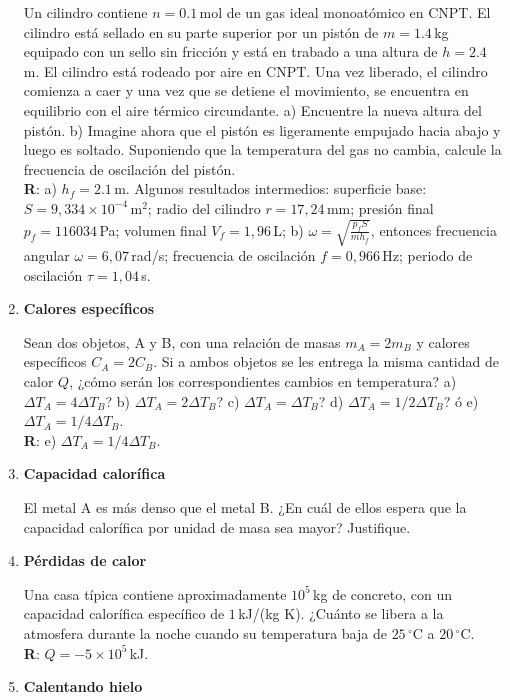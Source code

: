 \documentclass[a4paper,12pt]{article}
\begin{document}
\begin{enumerate}
		Un cilindro contiene $n=0.1$\,mol de un gas ideal monoatómico en CNPT.
		El cilindro está sellado en su parte superior por un pistón de
		$m=1.4$\,kg equipado con un sello sin fricción y está en trabado a una
		altura de $h=2.4$\,m. El cilindro está rodeado por aire en CNPT. Una
		vez liberado, el cilindro comienza a caer y una vez que se detiene el
		movimiento, se encuentra en equilibrio con el aire térmico circundante.
		a) Encuentre la nueva altura del pistón. b) Imagine ahora que el pistón
		es ligeramente empujado hacia abajo y luego es soltado. Suponiendo que
		la temperatura del gas no cambia, calcule la frecuencia de oscilación
		del pistón.
		\\{\bf R}: a) $h_f=2.1$\,m. Algunos resultados intermedios: superficie
		base: $S=9,334 \times 10^{-4}$\,m$^2$; radio del cilindro
		$r=17,24$\,mm; presión final $p_f=116034$\,Pa; volumen final
		$V_f=1,96$\,L; b) $\omega=\sqrt{\frac{p_f S}{m h_f}}$, entonces
		frecuencia angular $\omega=6,07$\,rad/s; frecuencia de oscilación
		$f=0,966$\,Hz; periodo de oscilación $\tau = 1,04$\,s. 
		
	\item {\bf{Calores específicos}}
 
		Sean dos objetos, A y B, con una relación de masas $m_A = 2 m_B$ y
		calores específicos $C_A = 2 C_B$. Si a ambos objetos se les entrega la
		misma cantidad de calor $Q$, ¿cómo serán los correspondientes cambios
		en temperatura? a) $\Delta T_A = 4 \Delta T_B$? b) $\Delta T_A = 2
		\Delta T_B$? c) $\Delta T_A = \Delta T_B$? d) $\Delta T_A = 1/2 \Delta
		T_B$? ó e) $\Delta T_A = 1/4 \Delta T_B$.
		\\{\bf R}: e) $\Delta T_A = 1/4 \Delta T_B$.

	\item {\bf{Capacidad calorífica}}

		El metal A es más denso que el metal B. ¿En cuál de ellos espera que la
		capacidad calorífica por unidad de masa sea mayor? Justifique.

	\item {\bf{Pérdidas de calor}} 

		Una casa típica contiene aproximadamente $10^5$\,kg de concreto, con un
		capacidad calorífica específico de $1$\,kJ/(kg K). ¿Cuánto se libera a
		la atmosfera durante la noche cuando su temperatura baja de
		$25\,^\circ$C a $20\,^\circ$C.
		\\{\bf R}: $Q=-5 \times 10^5$\,kJ. 

	\item {\bf{Calentando hielo}}


\end{enumerate}
\end{document}
